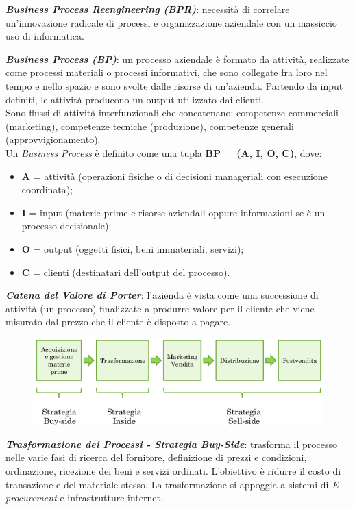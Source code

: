 \documentclass[a4paper, notitlepage, 9pt]{extreport}
\begin{document}
\noindent
\textit{\textbf{Business Process Reengineering (BPR)}}: necessità di correlare un’innovazione radicale di processi e organizzazione aziendale con un massiccio uso di informatica.

\noindent
\textit{\textbf{Business Process (BP)}}: un processo aziendale è formato da attività, realizzate come processi materiali o processi informativi, che sono collegate fra loro nel tempo e nello spazio e sono svolte dalle risorse di un’azienda. Partendo da input definiti, le attività producono
un output utilizzato dai clienti.\\
Sono flussi di attività interfunzionali che concatenano: competenze commerciali (marketing), competenze tecniche (produzione), competenze generali (approvvigionamento).\\
Un \textit{Business Process} è definito come una tupla \textbf{BP = (A, I, O, C)}, dove:
\begin{itemize}
	\item \textbf{A} = attività (operazioni fisiche o di decisioni manageriali con esecuzione coordinata);
	\item \textbf{I} = input (materie prime e risorse aziendali oppure informazioni se è un processo decisionale);
	\item \textbf{O} = output (oggetti fisici, beni immateriali, servizi);
	\item \textbf{C} = clienti (destinatari dell’output del processo).
\end{itemize}
\textit{\textbf{Catena del Valore di Porter}}: l'azienda è vista come una successione di attività (un processo) finalizzate a produrre valore per il cliente che viene misurato dal prezzo che il cliente è disposto a pagare.
\begin{figure}[H]
	\centering
	\includegraphics[scale=0.45]{Cat}
\end{figure}
\noindent
\textit{\textbf{Trasformazione dei Processi - Strategia Buy-Side}}: trasforma il processo nelle varie fasi di ricerca del fornitore, definizione di prezzi e condizioni, ordinazione, ricezione dei beni e servizi ordinati. L'obiettivo è ridurre il costo di transazione e del materiale stesso. La trasformazione si appoggia a sistemi di \textit{E-procurement} e infrastrutture internet.
\end{document}
